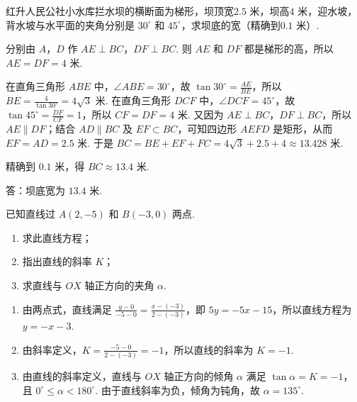 \begin{problem}
红升人民公社小水库拦水坝的横断面为梯形，坝顶宽\(2.5\text{ 米}\)，坝高\(4\text{ 米}\)，迎水坡，背水坡与水平面的夹角分别是 \(30^\circ\) 和 \(45^\circ\)，求坝底的宽（精确到\(0.1\text{ 米}\)）.
\end{problem}

\begin{solution}
分别由 \(A\)，\(D\) 作 \(AE\perp BC\)，\(DF\perp BC\). 则 \(AE\) 和 \(DF\) 都是梯形的高，所以 \(AE=DF=4\text{ 米}\).


在直角三角形 \(ABE\) 中，\(\angle ABE=30^\circ\)，故 \(\tan30^\circ=\frac{AE}{BE}\)，所以 \(BE=\frac{4}{\tan30^\circ}=4\sqrt{3}\text{ 米}\). 在直角三角形 \(DCF\) 中，\(\angle DCF=45^\circ\)，故 \(\tan45^\circ=\frac{DF}{CF}=1\)，所以 \(CF=DF=4\text{ 米}\). 又因为 \(AE\perp BC\)，\(DF\perp BC\)，所以 \(AE\parallel DF\)；结合 \(AD\parallel BC\) 及 \(EF\subset BC\)，可知四边形 \(AEFD\) 是矩形，从而 \(EF=AD=2.5\text{ 米}\). 于是 \(BC=BE+EF+FC=4\sqrt{3}+2.5+4\approx13.428\text{ 米}\).

精确到 \(0.1\text{ 米}\)，得 \(BC\approx13.4\text{ 米}\).

答：坝底宽为 \(13.4\text{ 米}\).
\end{solution}

\begin{problem}
已知直线过 \( A\left( 2,-5 \right) \) 和 \( B\left( -3,0 \right) \) 两点.

\begin{enumerate}
\item 求此直线方程；
\item 指出直线的斜率 \(K\)；
\item 求直线与 \(OX\) 轴正方向的夹角 \(\alpha\).
\end{enumerate}

\end{problem}

\begin{solution}
\begin{enumerate}
\item 由两点式，直线满足 \(\frac{y-0}{-5-0}=\frac{x-\left(-3\right)}{2-\left(-3\right)}\)，即 \(5y=-5x-15\)，所以直线方程为 \(y=-x-3\).
\item 由斜率定义，\(K=\frac{-5-0}{2-\left(-3\right)}=-1\)，所以直线的斜率为 \(K=-1\).
\item 由直线的斜率定义，直线与 \(OX\) 轴正方向的倾角 \(\alpha\) 满足 \(\tan\alpha=K=-1\)，且 \(0^\circ\leq\alpha<180^\circ\). 由于直线斜率为负，倾角为钝角，故 \(\alpha=135^\circ\).
\end{enumerate}
\end{solution}

